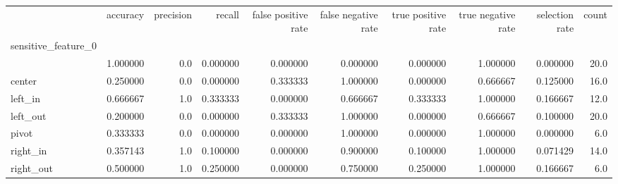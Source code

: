 \begin{tabular}{lrrrrrrrrr}
\toprule
{} &  accuracy &  precision &    recall &  false positive rate &  false negative rate &  true positive rate &  true negative rate &  selection rate &  count \\
sensitive\_feature\_0 &           &            &           &                      &                      &                     &                     &                 &        \\
\midrule
                    &  1.000000 &        0.0 &  0.000000 &             0.000000 &             0.000000 &            0.000000 &            1.000000 &        0.000000 &   20.0 \\
center              &  0.250000 &        0.0 &  0.000000 &             0.333333 &             1.000000 &            0.000000 &            0.666667 &        0.125000 &   16.0 \\
left\_in             &  0.666667 &        1.0 &  0.333333 &             0.000000 &             0.666667 &            0.333333 &            1.000000 &        0.166667 &   12.0 \\
left\_out            &  0.200000 &        0.0 &  0.000000 &             0.333333 &             1.000000 &            0.000000 &            0.666667 &        0.100000 &   20.0 \\
pivot               &  0.333333 &        0.0 &  0.000000 &             0.000000 &             1.000000 &            0.000000 &            1.000000 &        0.000000 &    6.0 \\
right\_in            &  0.357143 &        1.0 &  0.100000 &             0.000000 &             0.900000 &            0.100000 &            1.000000 &        0.071429 &   14.0 \\
right\_out           &  0.500000 &        1.0 &  0.250000 &             0.000000 &             0.750000 &            0.250000 &            1.000000 &        0.166667 &    6.0 \\
\bottomrule
\end{tabular}
